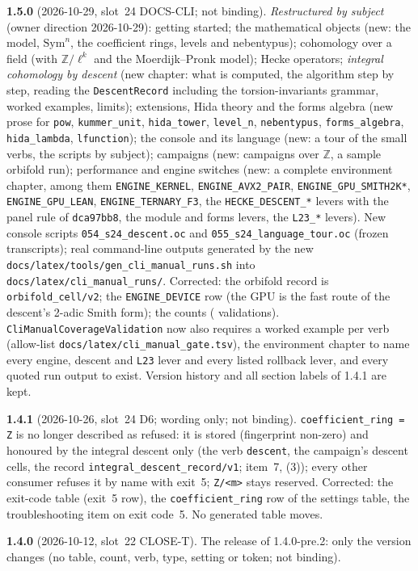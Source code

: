 \documentclass[11pt,openany]{report}
\newcommand{\Z}{\mathbb{Z}}
\newcommand{\Sym}{\mathrm{Sym}}
\newcommand{\file}[1]{\nolinkurl{#1}}
\newcommand{\vb}[1]{\texttt{#1}}
\begin{document}
\textbf{1.5.0} (2026-10-29, slot~24 DOCS-CLI; not binding). \emph{Restructured by subject} (owner direction 2026-10-29):
getting started; the mathematical objects (new: the model, $\Sym^n$, the coefficient rings, levels and nebentypus);
cohomology over a field (with $\Z/\ell^k$ and the Moerdijk--Pronk model); Hecke operators; \emph{integral cohomology by
descent} (new chapter: what is computed, the algorithm step by step, reading the \vb{DescentRecord} including the
torsion-invariants grammar, worked examples, limits); extensions, Hida theory and the forms algebra (new prose for
\vb{pow}, \vb{kummer\_unit}, \vb{hida\_tower}, \vb{level\_n}, \vb{nebentypus}, \vb{forms\_algebra}, \vb{hida\_lambda},
\vb{lfunction}); the console and its language (new: a tour of the small verbs, the scripts by subject); campaigns (new:
campaigns over $\Z$, a sample orbifold run); performance and engine switches (new: a complete environment chapter, among
them \texttt{ENGINE\_KERNEL}, \texttt{ENGINE\_AVX2\_PAIR}, \texttt{ENGINE\_GPU\_SMITH2K*}, \texttt{ENGINE\_GPU\_LEAN},
\texttt{ENGINE\_TERNARY\_F3}, the \texttt{HECKE\_DESCENT\_*} levers with the panel rule of \texttt{dca97bb8}, the module and
forms levers, the \texttt{L23\_*} levers). New console scripts \file{054_s24_descent.oc} and
\file{055_s24_language_tour.oc} (frozen transcripts); real command-line outputs generated by the new
\file{docs/latex/tools/gen_cli_manual_runs.sh} into \file{docs/latex/cli_manual_runs/}. Corrected: the orbifold record is
\texttt{orbifold\_cell/v2}; the \texttt{ENGINE\_DEVICE} row (the GPU is the fast route of the descent's 2-adic Smith form);
the counts (\CMNumValidations{} validations). \vb{CliManualCoverageValidation} now also requires a worked example per verb
(allow-list \file{docs/latex/cli_manual_gate.tsv}), the environment chapter to name every engine, descent and
\texttt{L23} lever and every listed rollback lever, and every quoted run output to exist. Version history and all
section labels of 1.4.1 are kept.\par\smallskip

\textbf{1.4.1} (2026-10-26, slot~24 D6; wording only; not binding). \texttt{coefficient\_ring = Z} is no longer described as refused: it is stored (fingerprint non-zero) and honoured by the integral descent only (the verb \vb{descent}, the campaign's descent cells, the record \texttt{integral\_descent\_record/v1}; {} item~7, {}(3)); every other consumer refuses it by name with exit~5; \texttt{Z/<m>} stays reserved. Corrected: the exit-code table (exit~5 row), the \vb{coefficient\_ring} row of the settings table, the troubleshooting item on exit code~5. No generated table moves.\par\smallskip
\textbf{1.4.0} (2026-10-12, slot~22 CLOSE-T). The release of 1.4.0-pre.2: only the version changes (no table, count, verb, type, setting or token; not binding).
\end{document}
